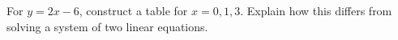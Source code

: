 For $y=2x-6$, construct a table for $x=0,1,3$. Explain how this differs from solving a system of two linear equations.
